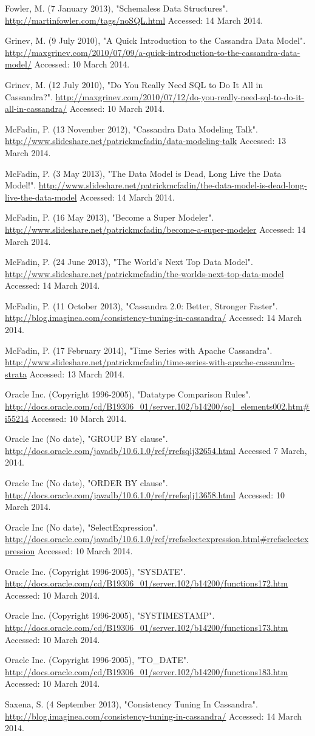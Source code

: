 \documentclass[letterpaper]{article}
\begin{document}
Fowler, M. (7 January 2013), "Schemaless Data Structures".
\url{http://martinfowler.com/tags/noSQL.html}
Accessed: 14 March 2014.


Grinev, M. (9 July 2010), "A Quick Introduction to the Cassandra Data Model".
\url{http://maxgrinev.com/2010/07/09/a-quick-introduction-to-the-cassandra-data-model/}
Accessed: 10 March 2014.

Grinev, M. (12 July 2010), "Do You Really Need SQL to Do It All in Cassandra?".
\url{ http://maxgrinev.com/2010/07/12/do-you-really-need-sql-to-do-it-all-in-cassandra/}
Accessed: 10 March 2014.


McFadin, P. (13 November 2012), "Cassandra Data Modeling Talk".
\url{http://www.slideshare.net/patrickmcfadin/data-modeling-talk}
Accessed: 13 March 2014.

McFadin, P. (3 May 2013), "The Data Model is Dead, Long Live the Data Model!".
\url{http://www.slideshare.net/patrickmcfadin/the-data-model-is-dead-long-live-the-data-model}
Accessed: 14 March 2014.

McFadin, P. (16 May 2013), "Become a Super Modeler".
\url{http://www.slideshare.net/patrickmcfadin/become-a-super-modeler}
Accessed: 14 March 2014.

McFadin, P. (24 June 2013), "The World's Next Top Data Model".
\url{http://www.slideshare.net/patrickmcfadin/the-worlds-next-top-data-model}
Accessed: 14 March 2014.

McFadin, P. (11 October 2013), "Cassandra 2.0: Better, Stronger Faster".
\url{http://blog.imaginea.com/consistency-tuning-in-cassandra/}
Accessed: 14 March 2014.

McFadin, P. (17 February 2014), "Time Series with Apache Cassandra".
\url{http://www.slideshare.net/patrickmcfadin/time-series-with-apache-cassandra-strata}
Accessed: 13 March 2014.

Oracle Inc. (Copyright 1996-2005), "Datatype Comparison Rules".
\url{http://docs.oracle.com/cd/B19306_01/server.102/b14200/sql_elements002.htm#i55214}
Accessed: 10 March 2014.

Oracle Inc (No date), "GROUP BY clause".
\url{http://docs.oracle.com/javadb/10.6.1.0/ref/rrefsqlj32654.html}
Accessed 7 March, 2014.

Oracle Inc (No date), "ORDER BY clause".
\url{http://docs.oracle.com/javadb/10.6.1.0/ref/rrefsqlj13658.html}
Accessed: 10 March 2014.

Oracle Inc (No date), "SelectExpression".
\url{http://docs.oracle.com/javadb/10.6.1.0/ref/rrefselectexpression.html#rrefselectexpression}
Accessed: 10 March 2014.

Oracle Inc. (Copyright 1996-2005), "SYSDATE".
\url{http://docs.oracle.com/cd/B19306_01/server.102/b14200/functions172.htm}
Accessed: 10 March 2014.

Oracle Inc. (Copyright 1996-2005), "SYSTIMESTAMP".
\url{http://docs.oracle.com/cd/B19306_01/server.102/b14200/functions173.htm}
Accessed: 10 March 2014.

Oracle Inc. (Copyright 1996-2005), "TO\_DATE".
\url{http://docs.oracle.com/cd/B19306_01/server.102/b14200/functions183.htm}
Accessed: 10 March 2014.

Saxena, S. (4 September 2013), "Consistency Tuning In Cassandra".
\url{http://blog.imaginea.com/consistency-tuning-in-cassandra/}
Accessed: 14 March 2014.
\end{document}
